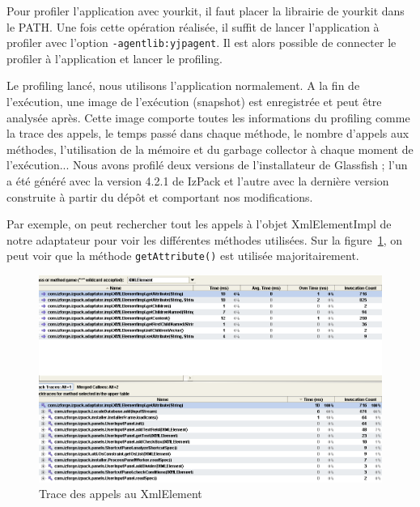 Pour profiler l'application avec yourkit, il faut placer la librairie de yourkit dans le PATH.
Une fois cette opération réalisée, il suffit de lancer l'application à profiler avec l'option \verb|-agentlib:yjpagent|.
Il est alors possible de connecter le profiler à l'application et lancer le profiling.

Le profiling lancé, nous utilisons l'application normalement.
A la fin de l'exécution, une image de l'exécution (snapshot) est enregistrée et peut être analysée après.
Cette image comporte toutes les informations du profiling comme la trace des appels, le temps passé dans chaque méthode, le nombre d'appels aux méthodes, l'utilisation de la mémoire et du garbage collector à chaque moment de l'exécution...
Nous avons profilé deux versions de l'installateur de Glassfish ; l'un a été généré avec la version 4.2.1 de IzPack et l'autre avec la dernière version construite à partir du dépôt et comportant nos modifications.

Par exemple, on peut rechercher tout les appels à l'objet XmlElementImpl de notre adaptateur pour voir les différentes méthodes utilisées. Sur la figure~\ref{fig:yourkitXmlElement}, on peut voir que la méthode \verb|getAttribute()| est utilisée majoritairement.
\begin{figure}[H]
	\centering
	\includegraphics[width=1\textwidth]{../image/yourkitXmlElement.png}
	\caption{Trace des appels au XmlElement}
	\label{fig:yourkitXmlElement}
\end{figure}

